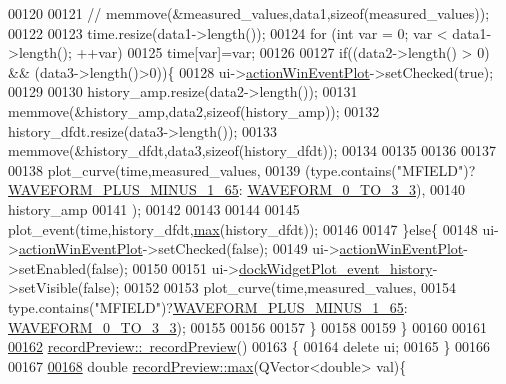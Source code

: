 \begin{DoxyCode}
00120 
00121    \textcolor{comment}{// memmove(&measured\_values,data1,sizeof(measured\_values));}
00122 
00123     time.resize(data1->length());
00124     \textcolor{keywordflow}{for} (\textcolor{keywordtype}{int} var = 0; var < data1->length(); ++var)
00125         time[var]=var;
00126 
00127     \textcolor{keywordflow}{if}((data2->length() > 0) && (data3->length()>0))\{
00128         ui->\hyperlink{a00028_ac72ec9c8679d46fd43a87f99ee6db893}{actionWinEventPlot}->setChecked(\textcolor{keyword}{true});
00129 
00130         history\_amp.resize(data2->length());
00131         memmove(&history\_amp,data2,\textcolor{keyword}{sizeof}(history\_amp));
00132         history\_dfdt.resize(data3->length());
00133         memmove(&history\_dfdt,data3,\textcolor{keyword}{sizeof}(history\_dfdt));
00134 
00135 
00136 
00137 
00138         plot\_curve(time,measured\_values,
00139                   (type.contains(\textcolor{stringliteral}{"MFIELD"})?\hyperlink{a00034_a0923d3b365a36e1e8c401cec964aa36f}{WAVEFORM\_PLUS\_MINUS\_1\_65}:
      \hyperlink{a00034_ae18fed2471b16a8516d721ff60671dd9}{WAVEFORM\_0\_TO\_3\_3}),
00140                   history\_amp
00141                   );
00142 
00143 
00144 
00145         plot\_event(time,history\_dfdt,\hyperlink{a00020_ad38222699419e6ac871ce2a23c6d292e}{max}(history\_dfdt));
00146 
00147     \}\textcolor{keywordflow}{else}\{
00148         ui->\hyperlink{a00028_ac72ec9c8679d46fd43a87f99ee6db893}{actionWinEventPlot}->setChecked(\textcolor{keyword}{false});
00149         ui->\hyperlink{a00028_ac72ec9c8679d46fd43a87f99ee6db893}{actionWinEventPlot}->setEnabled(\textcolor{keyword}{false});
00150 
00151         ui->\hyperlink{a00028_a2a8f7ee8d4458dd20481c8a1c29ce185}{dockWidgetPlot\_event\_history}->setVisible(\textcolor{keyword}{false});
00152 
00153         plot\_curve(time,measured\_values,
00154                   type.contains(\textcolor{stringliteral}{"MFIELD"})?\hyperlink{a00034_a0923d3b365a36e1e8c401cec964aa36f}{WAVEFORM\_PLUS\_MINUS\_1\_65}:
      \hyperlink{a00034_ae18fed2471b16a8516d721ff60671dd9}{WAVEFORM\_0\_TO\_3\_3});
00155 
00156 
00157     \}
00158 
00159 \}
00160 
00161 
\hypertarget{a00042_source_l00162}{}\hyperlink{a00020_ab04c69b9693e7a59a08a5faa6742b71f}{00162} \hyperlink{a00020_ab04c69b9693e7a59a08a5faa6742b71f}{recordPreview::~recordPreview}()
00163 \{
00164     \textcolor{keyword}{delete} ui;
00165 \}
00166 
00167 
\hypertarget{a00042_source_l00168}{}\hyperlink{a00020_ad38222699419e6ac871ce2a23c6d292e}{00168} \textcolor{keywordtype}{double} \hyperlink{a00020_ad38222699419e6ac871ce2a23c6d292e}{recordPreview::max}(QVector<double> val)\{

\end{DoxyCode}
